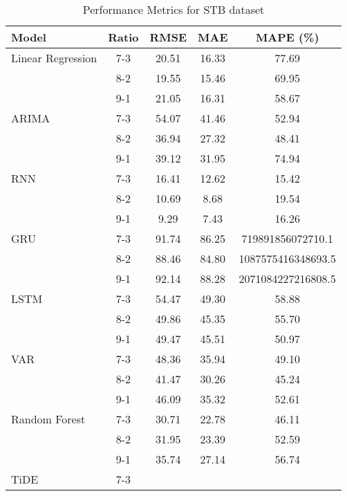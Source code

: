 \begin{table}[h!]
    \centering
    \caption{Performance Metrics for STB dataset}
    \begin{tabular}{|l|c|c|c|c|}
    \hline
    \rowcolor{orange!30} \textbf{Model} & \textbf{Ratio} & \textbf{RMSE} & \textbf{MAE} & \textbf{MAPE (\%)} \\ \hline
    \rowcolor{white} Linear Regression & 7-3 & 20.51 & 16.33 & 77.69 \\ \hline
    \rowcolor{white}  & 8-2 & 19.55 & 15.46 & 69.95 \\ \hline
    \rowcolor{white}  & 9-1 & 21.05 & 16.31 & 58.67 \\ \hline
    \rowcolor{white} ARIMA & 7-3 & 54.07 & 41.46 & 52.94 \\ \hline
    \rowcolor{white}  & 8-2 & 36.94 & 27.32 & 48.41 \\ \hline
    \rowcolor{white}  & 9-1 & 39.12 & 31.95 & 74.94 \\ \hline
    \rowcolor{white} RNN & 7-3 & 16.41 & 12.62 & 15.42 \\ \hline
    \rowcolor{white}  & 8-2 & 10.69 & 8.68 & 19.54 \\ \hline
    \rowcolor{white}  & 9-1 & 9.29 & 7.43 & 16.26 \\ \hline
    \rowcolor{white} GRU & 7-3 & 91.74 & 86.25 & 719891856072710.1 \\ \hline
    \rowcolor{white}  & 8-2 & 88.46 & 84.80 &  1087575416348693.5 \\ \hline
    \rowcolor{white}  & 9-1 & 92.14 & 88.28 & 2071084227216808.5 \\ \hline
    \rowcolor{white} LSTM & 7-3 & 54.47 & 49.30 & 58.88 \\ \hline
    \rowcolor{white}  & 8-2 & 49.86 & 45.35 & 55.70 \\ \hline
    \rowcolor{white}  & 9-1 & 49.47 & 45.51 & 50.97 \\ \hline
    \rowcolor{white} VAR & 7-3 & 48.36 & 35.94 & 49.10 \\ \hline
    \rowcolor{white}  & 8-2 & 41.47 & 30.26 & 45.24 \\ \hline
    \rowcolor{white}  & 9-1 & 46.09 & 35.32 & 52.61 \\ \hline
    \rowcolor{white} Random Forest & 7-3 & 30.71 & 22.78 & 46.11 \\ \hline
    \rowcolor{white}  & 8-2 & 31.95 & 23.39 & 52.59 \\ \hline
    \rowcolor{white}  & 9-1 & 35.74 & 27.14 & 56.74 \\ \hline
    \rowcolor{green!30} TiDE & 7-3 &  &  &  \\ \hline

\end{tabular}
\end{table}
